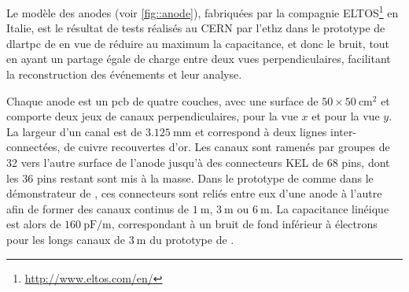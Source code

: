             
      Le modèle des anodes (voir \autoref{fig::anode}), fabriquées par la compagnie ELTOS\footnote{\url{http://www.eltos.com/en/}} en Italie, est le résultat de tests réalisés au CERN par l'\gls{ethz} dans le prototype de \gls{dlartpc} de \threeL{}\cite{Cantini2013} en vue de réduire au maximum la capacitance, et donc le bruit, tout en ayant un partage égale de charge entre deux vues perpendiculaires, facilitant la reconstruction des événements et leur analyse.
            
      Chaque anode est un \gls{pcb} de quatre couches, avec une surface de  $50\times\SI{50}{\centi\meter\squared}$ et comporte deux jeux de canaux perpendiculaires,  pour la vue $x$ et  pour la vue $y$. La largeur d'un canal est de $\SI{3.125}{\milli\meter}$ et correspond à deux lignes inter-connectées, de cuivre recouvertes d'or. Les canaux sont ramenés par groupes de 32 vers l'autre surface de l'anode jusqu'à des connecteurs KEL de 68 pins, dont les 36 pins restant sont mis à la masse. Dans le prototype de \TOO{} comme dans le démonstrateur de \SSS{}, ces connecteurs sont reliés entre eux d'une anode à l'autre afin de former des canaux continus de $\SI{1}{\meter}$, $\SI{3}{\meter}$ ou $\SI{6}{\meter}$. La capacitance linéique est alors de $\SI{160}{\pico\farad\per\meter}$, correspondant à un bruit de fond inférieur à  électrons\cite{Aimard2018} pour les longs canaux de $\SI{3}{\meter}$ du prototype de \TOO{}.
            
